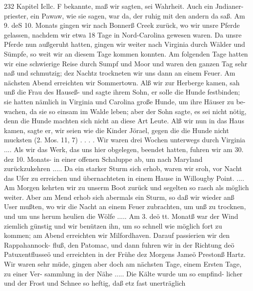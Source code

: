 232 Kapitel Icllc. F
bekannte, maß wir sagten, sei Wahrheit. Auch ein Jndianer-
priester, ein Pawaw, wie sie sagen, war da, der ruhig mit den
andern da saß. Am 9. deS 10. Monats gingen wir nach Bonnerß
Creek zurück, wo wir unsre Pferde gelassen, nachdem wir etwa
18 Tage in Nord-Carolina gewesen waren.
Da unsre Pferde nun außgeruht hatten, gingen wir weiter
nach Virginia durch Wälder und Sümpfe, so weit wir an diesem
Tage kommen konnten. Am folgenden Tage hatten wir eine
schwierige Reise durch Sumpf und Moor und waren den ganzen
Tag sehr naß und schmutzig; dez Nachtz trockneten wir uns dann
an einem Feuer. Am nächsten Abend erreichten wir Sommertown.
Alß wir zur Herberge kamen, sah unß die Frau des Hauseß- und sagte
ihrem Sohn, er solle die Hunde festbinden; sie hatten nämlich
in Virginia und Carolina große Hunde, um ihre Häuser zu be-
wachen, da sie so einsam im Walde leben; aber der Sohn sagte,
es sei nicht nötig, denn die Hunde machten sich nicht an diese
Art Leute. Alß wir nun in das Haus kamen, sagte er, wir
seien wie die Kinder Jörael, gegen die die Hunde nicht mucksten
(2. Mos. 11, 7) . . . .
Wir waren drei Wochen unterwegs durch Virginia .... Als
wir das Werk, das uns hier obgelegen, beendet hatten, fuhren
wir am 30. dez 10. Monats- in einer offenen Schaluppe ab, um
nach Maryland zurückzukehren ..... Da ein starker Sturm sich
erhob, waren wir sroh, vor Nacht das Ufer zu erreichen und
übernachteten in einem Hause in Willougby Point. .... Am
Morgen kehrten wir zu unserm Boot zurück und segelten so rasch
als möglich weiter. Aber am Mend erhob sich abermals ein
Sturm, so daß wir wieder anß User mußten, wo wir die Nacht
an einem Feuer zubrachten, um unß zu trocknen, und um uns
herum heulien die Wölfe ..... Am 3. deö tt. Monatß
war der Wind ziemlich günstig und wir benützen ihn, um so
schnell wie möglich fort zu kommen; am Abend erreichten
wir Milfordhaven. Darauf passierien wir den Rappahannock-
fluß, den Patomac, und dann fuhren wir in der Richtung
deö Patuxentflusseö und erreichten in der Frühe dez Morgens
Jameö Prestonß Hartz. Wir waren sehr müde, gingen aber
doch am nächsten Tage, einem Ersten Tage, zu einer Ver-
sammlung in der Nähe ..... Die Kälte wurde um so empfind-
licher und der Frost und Schnee so heftig, daß etz fast unerträglich


